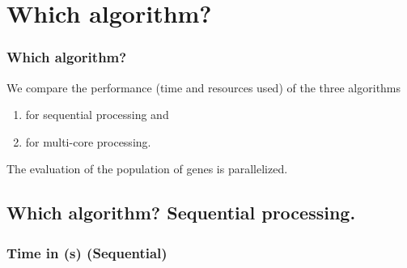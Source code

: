 \documentclass[18pt,c]{beamer}
\makeatletter
\let\beamer@writeslidentry@miniframeson=\beamer@writeslidentry
\newcommand*{\miniframeson}{\let\beamer@writeslidentry=\beamer@writeslidentry@miniframeson}
\makeatother
\begin{document}
\section{Which algorithm?}
\begin{frame}
\frametitle{
Which algorithm?
}
We compare the performance (time and resources used) of the three algorithms
\begin{enumerate}
\item for sequential processing and 
 
\item for multi-core processing.
\end{enumerate}
 
The evaluation of the population of genes is parallelized.
\end{frame}%
\miniframeson
\subsection{Which algorithm? Sequential processing.}
 \begin{frame}
 \fontsize{8pt}{9pt}\selectfont
 \frametitle{ Time in (s) (Sequential) }

 \label{ExpAStatsTable009.tex}  
 \end{frame}
\end{document}

